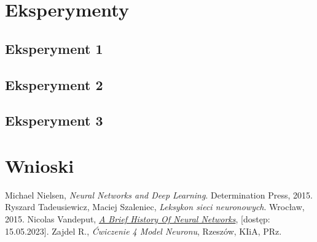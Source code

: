 \documentclass{article}
\begin{document}
\section{Eksperymenty}
\subsection{Eksperyment 1}
\subsection{Eksperyment 2}
\subsection{Eksperyment 3}
\section{Wnioski}
\begin{thebibliography}{9}
    Michael Nielsen,
    \emph{Neural Networks and Deep Learning}.
    Determination Press,
    2015.
    Ryszard Tadeusiewicz, Maciej Szaleniec,
    \emph{Leksykon sieci neuronowych}.
    Wrocław,
    2015.
    Nicolas Vandeput,
    \href{https://medium.com/analytics-vidhya/a-brief-history-of-neural-networks-c234639a43f1}{\emph{A Brief History Of Neural Networks}},
    [dostęp: 15.05.2023].
    Zajdel R.,
    \emph{Ćwiczenie 4 Model Neuronu},
    Rzeszów,
    KIiA, PRz.
\end{thebibliography}
\end{document}
